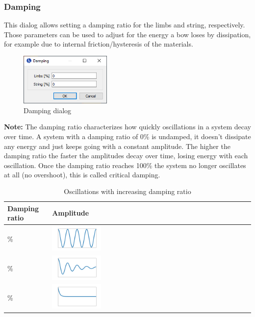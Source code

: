 \documentclass[12pt]{article}
\begin{document}
\newpage
\subsubsection{Damping}

This dialog allows setting a damping ratio for the limbs and string, respectively.
Those parameters can be used to adjust for the energy a bow loses by dissipation, for example due to internal friction/hysteresis of the materials.

\bigskip

\begin{figure}[H]
\centering
\includegraphics[width=0.4\textwidth]{figures/screenshots/input/damping}
\caption{Damping dialog}
\label{fig:damping}
\end{figure}

\textbf{Note:} The damping ratio characterizes how quickly oscillations in a system decay over time.
A system with a damping ratio of 0\% is undamped, it doesn't dissipate any energy and just keeps going with a constant amplitude.
The higher the damping ratio the faster the amplitudes decay over time, losing energy with each oscillation.
Once the damping ratio reaches 100\% the system no longer oscillates at all (no overshoot), this is called critical damping.

\begin{table}[H]
\centering
\begin{tabular}{| m{4cm} | m{4cm} |}
\hline
\textbf{Damping ratio} & \textbf{Amplitude} \\ \hline
\center 0\% & \includegraphics[width=0.25\textwidth]{figures/damping-ratio-00} \\ \hline
\center 10\% & \includegraphics[width=0.25\textwidth]{figures/damping-ratio-01} \\ \hline
\center 100\% & \includegraphics[width=0.25\textwidth]{figures/damping-ratio-10} \\ \hline
\end{tabular}
\caption{Oscillations with increasing damping ratio}
\label{tbl:damping-ratio}
\end{table}
\end{document}
